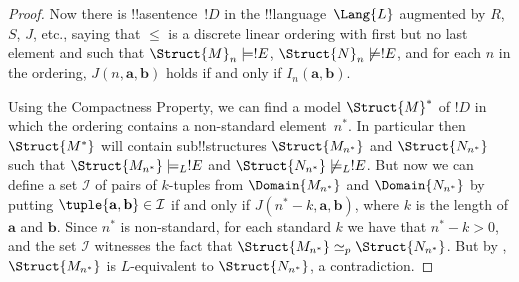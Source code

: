 \documentclass[../../../include/open-logic-section]{subfiles}
\begin{document}
\begin{proof}
Now there is !!a{sentence}~$!D$ in the !!{language}~$\Lang{L}$ augmented
by $R$, $S$, $J$, etc., saying that $\le$ is a discrete linear ordering
with first but no last element and such that $\Struct{M}_n \models
!E$, $\Struct{N}_n \not\models !E$, and for each $n$ in the
ordering, $J(n, \mathbf{a}, \mathbf{b})$ holds if and only if
$I_n(\mathbf{a}, \mathbf{b})$.

Using the Compactness Property, we can find a model $\Struct{M}^*$ of
$!D$ in which the ordering contains a non-standard element~$n^*$. In
particular then $\Struct{M^*}$ will contain sub!!{structure}s
$\Struct{M_{n^*}}$ and $\Struct{N_{n^*}}$ such that $\Struct{M_{n^*}}
\models_L !E$ and $\Struct{N_{n^*}} \not\models_L !E$. But now we can
define a set $\mathcal{I}$ of pairs of $k$-tuples from
$\Domain{M_{n^*}}$ and $\Domain{N_{n^*}}$ by putting
$\tuple{\mathbf{a}, \mathbf{b}} \in \mathcal{I}$ if and only if
$J(n^*-k, \mathbf{a}, \mathbf{b})$, where $k$ is the length of
$\mathbf{a}$ and $\mathbf{b}$. Since $n^*$ is non-standard, for each
standard $k$ we have that $n^* - k >0$, and the set $\mathcal{I}$
witnesses the fact that $\Struct{M_{n^*}} \simeq_p
\Struct{N_{n^*}}$. But by ,
$\Struct{M_{n^*}}$ is $L$-equivalent to $\Struct{N_{n^*}}$, a
contradiction.
\end{proof}
\end{document}
